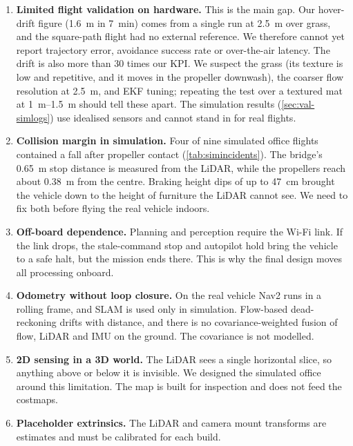 \begin{enumerate}[leftmargin=*,itemsep=2pt]
  \item \textbf{Limited flight validation on hardware.} This is the main gap. Our
    hover-drift figure (\SI{1.6}{\metre} in \SI{7}{\minute}) comes from a single run at
    \SI{2.5}{\metre} over grass, and the square-path flight had no external reference.
    We therefore cannot yet report trajectory error, avoidance success rate or
    over-the-air latency. The drift is also more than 30 times our KPI. We suspect the
    grass (its texture is low and repetitive, and it moves in the propeller downwash),
    the coarser flow resolution at \SI{2.5}{\metre}, and EKF tuning; repeating the test
    over a textured mat at \SIrange{1}{1.5}{\metre} should tell these apart. The
    simulation results (\cref{sec:val-simlogs}) use idealised sensors and cannot stand in
    for real flights.
  \item \textbf{Collision margin in simulation.} Four of nine simulated office flights
    contained a fall after propeller contact (\cref{tab:simincidents}). The bridge's
    \SI{0.65}{m} stop distance is measured from the LiDAR, while the propellers reach
    about \SI{0.38}{m} from the centre. Braking height dips of up to \SI{47}{cm} brought
    the vehicle down to the height of furniture the LiDAR cannot see. We need to fix both
    before flying the real vehicle indoors.
  \item \textbf{Off-board dependence.} Planning and perception require the Wi-Fi link.
    If the link drops, the
    stale-command stop and autopilot hold bring the vehicle to a safe halt, but the
    mission ends there. This is why the final design moves all processing onboard.
  \item \textbf{Odometry without loop closure.} On the real vehicle Nav2 runs in a
    rolling  frame, and SLAM is used only in simulation. Flow-based
    dead-reckoning drifts with distance, and there is no covariance-weighted fusion of
    flow, LiDAR and IMU on the ground. The  covariance is not modelled.
  \item \textbf{2D sensing in a 3D world.} The LiDAR sees a single horizontal
    slice, so anything above or below it is invisible. We designed the simulated office
    around this limitation. The
     map is built for inspection and does not feed the costmaps.
  \item \textbf{Placeholder extrinsics.} The LiDAR and camera mount transforms are
    estimates and must be calibrated for each build.

\end{enumerate}
